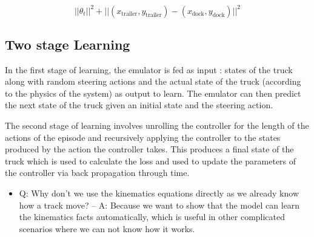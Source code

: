 \begin{equation*}
    ||\theta_{t}||^2 + ||(x_{\text{trailer}}, y_{\text{trailer}}) - (x_{\text{dock}}, y_{\text{dock}})||^2     
\end{equation*}




\subsection{Two stage Learning}\label{sec:truck-model}
In the first stage of learning, the emulator is fed as input : states of the truck along with random steering actions and the actual state of the truck (according to the physics of the system) as output to learn. The emulator can then predict the next state of the truck given an initial state and the steering action.

The second stage of learning involves unrolling the controller for the length of the actions of the episode and recursively applying the controller to the states produced by the action the controller takes. This produces a final state of the truck which is used to calculate the loss and used to update the parameters of the controller via back propagation through time.

\begin{itemize}
\item Q: Why don't we use the kinematics equations directly as we already know how a track move? 
-- A: Because we want to show that the model can learn the kinematics facts automatically, which is useful in other complicated scenarios where we can not know how it works.
\end{itemize}

